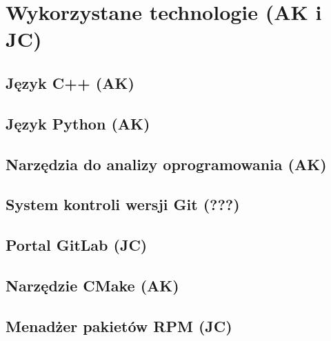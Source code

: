 \chapter{Wykorzystane technologie (AK i JC)}
\label{ch:technologies}

\graphicspath{{2_technologies/static/}}

\section{Język C++ (AK)} %
\section{Język Python (AK)}
\section{Narzędzia do analizy oprogramowania (AK)} %
\section{System kontroli wersji Git (???)} %
\section{Portal GitLab (JC)}
\section{Narzędzie CMake (AK)} %
\section{Menadżer pakietów RPM (JC)}


